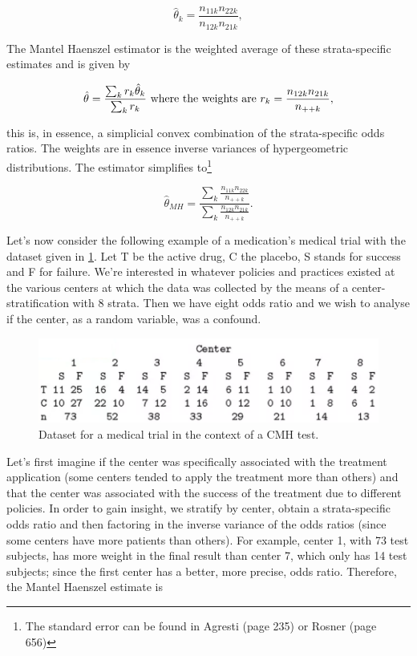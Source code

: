 \documentclass{homework}
\begin{document}
$$
\hat{\theta}_k = \frac{n_{11k}n_{22k}}{n_{12k}n_{21k}},
$$

The Mantel Haenszel estimator is the weighted average of these strata-specific estimates and is given by

\begin{align*}
    \hat{\theta} = \frac{\sum_{k}r_{k}\hat{\theta}_k}{\sum_{k}r_{k}}\textnormal{ where the weights are } r_k = \frac{n_{12k}n_{21k}}{n_{++k}},
\end{align*}

this is, in essence, a simplicial convex combination of the strata-specific odds ratios. The weights are in essence inverse variances of hypergeometric distributions. The estimator simplifies to\footnote{
The standard error can be found in Agresti (page 235) or Rosner (page 656)} 

$$
\hat{\theta}_{MH} = \frac{\sum_{k}\frac{n_{11k}n_{22k}}{n_{++k}}}{\sum_{k}\frac{ n_{12k}n_{21k}}{n_{++k}}}.
$$

Let's now consider the following example of a medication's medical trial with the dataset given in \ref{fig: CMH test}. Let T be the active drug, C the placebo, S stands for success and F for failure. We're interested in whatever policies and practices existed at the various centers at which the data was collected by the means of a center-stratification with 8 strata. Then we have eight odds ratio and we wish to analyse if the center, as a random variable, was a confound. 

\begin{figure}
    \centering
    \includegraphics[scale=0.5]{figs/data points_week4_part4.png}
    \caption{Dataset for a medical trial in the context of a CMH test.}
    \label{fig: CMH test}
\end{figure}

Let's first imagine if the center was specifically associated with the treatment application (some centers tended to apply the treatment more than others) and that the center was associated with the success of the treatment due to different policies. In order to gain insight, we stratify by center, obtain a strata-specific odds ratio and then factoring in the inverse variance of the odds ratios (since some centers have more patients than others). For example, center 1, with 73 test subjects, has more weight in the final result than center 7, which only has 14 test subjects; since the first center has a better, more precise, odds ratio. Therefore, the Mantel Haenszel estimate is 
\end{document}
